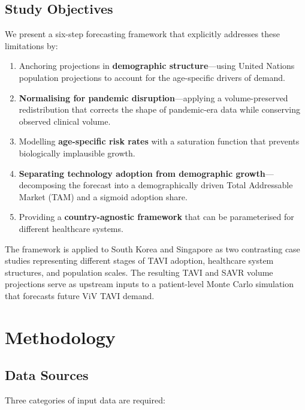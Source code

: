 \documentclass[12pt, a4paper]{article}
\begin{document}
\subsection{Study Objectives}

We present a six-step forecasting framework that explicitly addresses these limitations by:

\begin{enumerate}[leftmargin=*, itemsep=2pt]
    \item Anchoring projections in \textbf{demographic structure}---using United Nations population projections to account for the age-specific drivers of demand.
    \item \textbf{Normalising for pandemic disruption}---applying a volume-preserved redistribution that corrects the shape of pandemic-era data while conserving observed clinical volume.
    \item Modelling \textbf{age-specific risk rates} with a saturation function that prevents biologically implausible growth.
    \item \textbf{Separating technology adoption from demographic growth}---decomposing the forecast into a demographically driven Total Addressable Market (TAM) and a sigmoid adoption share.
    \item Providing a \textbf{country-agnostic framework} that can be parameterised for different healthcare systems.
\end{enumerate}

The framework is applied to South Korea and Singapore as two contrasting case studies representing different stages of TAVI adoption, healthcare system structures, and population scales. The resulting TAVI and SAVR volume projections serve as upstream inputs to a patient-level Monte Carlo simulation that forecasts future ViV TAVI demand.


\section{Methodology}

\subsection{Data Sources}

Three categories of input data are required:
\end{document}
